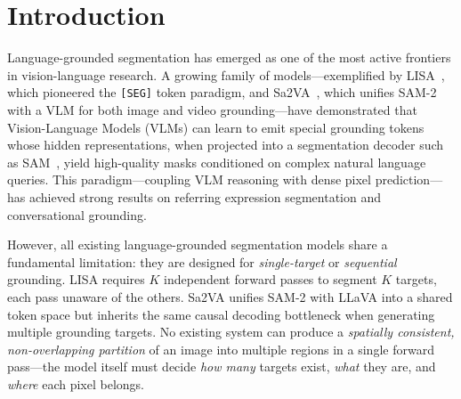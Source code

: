\documentclass{article}
\begin{document}
\begin{abstract}
warm-start from \texttt{<|im\_end|>} that unlock \texttt{[SEG]} emission at inference without disturbing the rest of Qwen's vocabulary; \textbf{batch multiplexing} that bypasses SAM's Slot-1 Positional Bias by forcing each texture query into its own independent forward pass; a \textbf{Winner-Takes-All pixel assignment} with a learned dustbin channel that produces a mathematically consistent, non-overlapping partition; a \textbf{permanently frozen SAM} (no LoRA); and a \textbf{two-stage curriculum} with ${\sim}8.2$M trainable parameters. We further contribute the \textbf{Detecture Pipeline}, a geometry-first texture mining framework for curating training data from large-scale datasets, and the \textbf{Real-World Texture Dataset (RWTD)}, a benchmark of 253 in-the-wild texture transition scenes.
\end{abstract}

\section{Introduction}

Language-grounded segmentation has emerged as one of the most active frontiers in vision-language research. A growing family of models---exemplified by LISA~\cite{lisa}, which pioneered the \texttt{[SEG]} token paradigm, and Sa2VA~\cite{sa2va}, which unifies SAM-2 with a VLM for both image and video grounding---have demonstrated that Vision-Language Models (VLMs) can learn to emit special grounding tokens whose hidden representations, when projected into a segmentation decoder such as SAM~\cite{sam}, yield high-quality masks conditioned on complex natural language queries. This paradigm---coupling VLM reasoning with dense pixel prediction---has achieved strong results on referring expression segmentation and conversational grounding.

However, all existing language-grounded segmentation models share a fundamental limitation: they are designed for \emph{single-target} or \emph{sequential} grounding. LISA requires $K$ independent forward passes to segment $K$ targets, each pass unaware of the others. Sa2VA unifies SAM-2 with LLaVA into a shared token space but inherits the same causal decoding bottleneck when generating multiple grounding targets. No existing system can produce a \emph{spatially consistent, non-overlapping partition} of an image into multiple regions in a single forward pass---the model itself must decide \emph{how many} targets exist, \emph{what} they are, and \emph{where} each pixel belongs.
\end{document}
